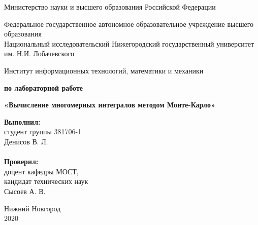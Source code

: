 \documentclass{report}
\begin{document}
\begin{titlepage}

\begin{center}
Министерство науки и высшего образования Российской Федерации
\end{center}

\begin{center}
Федеральное государственное автономное образовательное учреждение высшего образования \\
Национальный исследовательский Нижегородский государственный университет им. Н.И. Лобачевского
\end{center}

\begin{center}
Институт информационных технологий, математики и механики
\end{center}

\vspace{4em}

\begin{center}
\textbf{ по лабораторной работе} \\
\end{center}
\begin{center}
\textbf{\Large«Вычисление многомерных интегралов методом Монте-Карло»} \\
\end{center}

\vspace{4em}

\newbox{\lbox}
\newlength{\maxl}
\setlength{\maxl}{\wd\lbox}
\hfill\parbox{7cm}{
\hspace*{5cm}\hspace*{-5cm}\textbf{Выполнил:} \\ студент группы 381706-1 \\ Денисов В. Л.\\
\\
\hspace*{5cm}\hspace*{-5cm}\textbf{Проверил:}\\ доцент кафедры МОСТ, \\ кандидат технических наук \\ Сысоев А. В.
}

\vspace{\fill}

\begin{center} Нижний Новгород \\ 2020 \end{center}

\end{titlepage}
\end{document}
